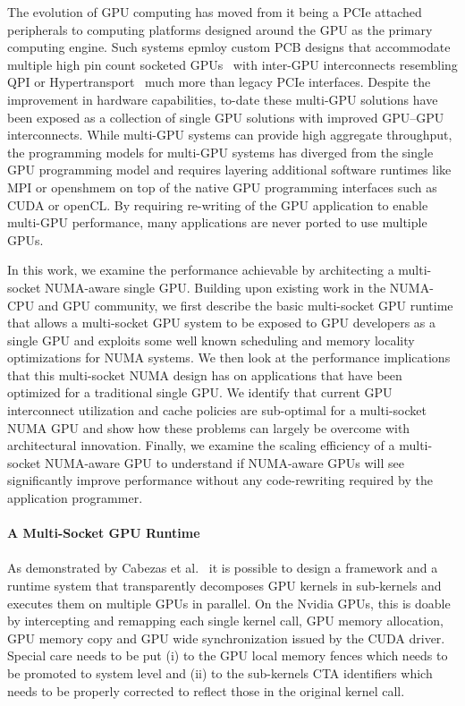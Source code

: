 The evolution of GPU computing has moved from it being a PCIe attached peripherals 
to computing platforms designed around the GPU as the primary computing engine. 
Such systems epmloy custom PCB designs that accommodate multiple high pin count socketed 
GPUs~\cite{DGX} with inter-GPU interconnects resembling QPI or 
Hypertransport~\cite{INTELQPI,AMDHT} much more than legacy PCIe interfaces.  
Despite the improvement in hardware capabilities, to-date these multi-GPU 
solutions have been exposed as a collection of single GPU solutions with improved GPU--GPU 
interconnects. While multi-GPU systems can provide high aggregate throughput, 
the programming models for multi-GPU systems has diverged from the single GPU 
programming model and requires layering additional software runtimes like MPI 
or openshmem on top of the native GPU programming interfaces such as CUDA or openCL.
By requiring re-writing of the GPU application to enable multi-GPU performance, 
many applications are never ported to use multiple GPUs.

In this work, we examine the performance achievable by architecting a 
multi-socket NUMA-aware single GPU.  Building upon existing work in the 
NUMA-CPU and GPU community, we first describe the basic multi-socket GPU runtime 
that allows a multi-socket GPU system to be exposed to GPU developers as a 
single GPU and exploits some well known scheduling and memory locality 
optimizations for NUMA systems. We then look at the performance implications 
that this multi-socket NUMA design has on applications that have been optimized 
for a traditional single GPU.  We identify that current GPU interconnect 
utilization and cache policies are sub-optimal for a multi-socket NUMA GPU and 
show how these problems can largely be overcome with architectural innovation.  
Finally, we examine the scaling efficiency of a multi-socket NUMA-aware GPU to 
understand if NUMA-aware GPUs will see significantly improve performance  
without any code-rewriting required by the application programmer.
\\\\
\textbf{A Multi-Socket GPU Runtime}
\\\\
\noindent As demonstrated by Cabezas et al.~\cite{Cabezas2015} it is possible 
to design a framework and a runtime system that transparently decomposes GPU 
kernels in sub-kernels and executes them on multiple GPUs in parallel. On the 
Nvidia GPUs, this is doable by intercepting and remapping each single kernel 
call, GPU memory allocation, GPU memory copy and GPU wide synchronization issued 
by the CUDA driver. Special care needs to be put (i) to the GPU local memory 
fences which needs to be promoted to system level and (ii) to the 
sub-kernels CTA identifiers which needs to be properly corrected to 
reflect those in the original kernel call. 
 
